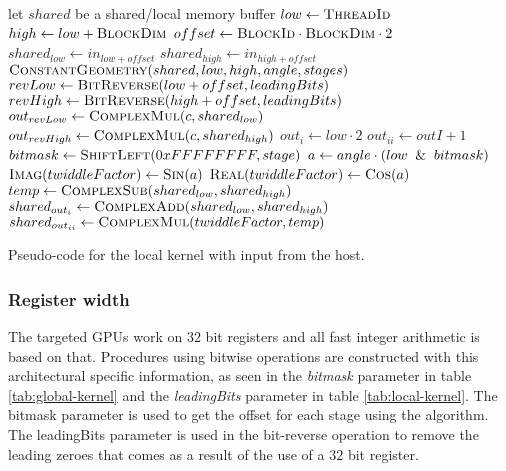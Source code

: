 \begin{algorithm}
	\centering
	\begin{algorithmic}[1]
            \State let $shared$ be a shared/local memory buffer     
            \State $low  \gets \Call{ThreadId}{}$
            \State $high \gets low + \Call{BlockDim}{}$   
            \State $offset \gets \Call{BlockId}{} \cdot \Call{BlockDim}{} \cdot 2$
            \State $shared_{low}  \gets in_{low + offset}$
            \State $shared_{high} \gets in_{high + offset}$
            \State $\Call{ConstantGeometry}{shared, low, high, angle, stages}$
            \State $revLow  \gets \Call{BitReverse}{low + offset, leadingBits}$
            \State $revHigh \gets \Call{BitReverse}{high + offset, leadingBits}$
            \State $out_{revLow}  \gets \Call{ComplexMul}{c, shared_{low}}$
            \State $out_{revHigh} \gets \Call{ComplexMul}{c, shared_{high}}$
        \EndProcedure
        \Statex
            \State $out_{i} \gets low \cdot 2$
            \State $out_{ii} \gets outI + 1$
            	\State $bitmask \gets \Call{ShiftLeft}{0xFFFFFFFF, stage}$
            	\State $a \gets angle \cdot (low \And bitmask)$
            	\State $\Call{Imag}{twiddleFactor} \gets \Call{Sin}{a}$
            	\State $\Call{Real}{twiddleFactor} \gets \Call{Cos}{a}$
				\State $temp \gets \Call{ComplexSub}{shared_{low}, shared_{high}}$
				\State $shared_{out_{i}} \gets \Call{ComplexAdd}{shared_{low}, shared_{high}}$
				\State $shared_{out_{ii}} \gets \Call{ComplexMul}{twiddleFactor, temp}$
			\EndFor
        \EndProcedure
	\end{algorithmic}
	\caption{Pseudo-code for the local kernel with input from the host.}
	\label{alg:device:local-kernel}
\end{algorithm}

\subsubsection{Register width}

The targeted \gls{GPU}s work on $32$ bit registers and all fast integer arithmetic is based on that. Procedures using bitwise operations are constructed with this architectural specific information, as seen in the \emph{bitmask} parameter in table \ref{tab:global-kernel} and the \emph{leadingBits} parameter in table \ref{tab:local-kernel}. The bitmask parameter is used to get the offset for each stage using the {\CTALG} algorithm. The leadingBits parameter is used in the bit-reverse operation to remove the leading zeroes that comes as a result of the use of a $32$ bit register.

